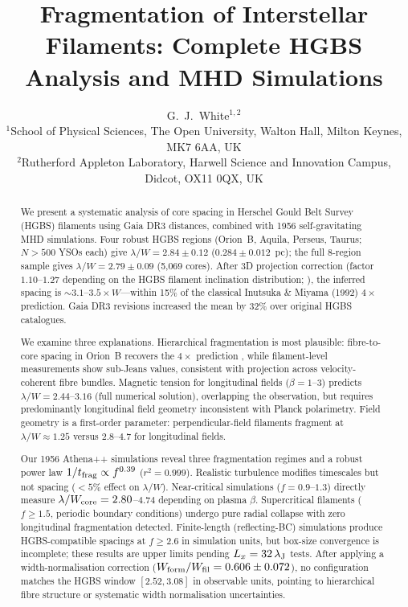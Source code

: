 \documentclass[twoside,twocolumn]{mnras}
\title{Fragmentation of Interstellar Filaments: Complete HGBS Analysis and MHD Simulations}
\author[G.~J.~White]{G.~J.~White$^{1,2}$\\
$^{1}$School of Physical Sciences, The Open University, Walton Hall, Milton Keynes, MK7 6AA, UK\\
$^{2}$Rutherford Appleton Laboratory, Harwell Science and Innovation Campus, Didcot, OX11 0QX, UK}
\begin{document}
\maketitle

\begin{abstract}
We present a systematic analysis of core spacing in Herschel Gould Belt Survey (HGBS)
filaments using Gaia DR3 distances, combined with 1956 self-gravitating MHD simulations.
Four robust HGBS regions (Orion~B, Aquila, Perseus, Taurus; $N>500$ YSOs each) give
$\lambda/W = 2.84 \pm 0.12$ ($0.284 \pm 0.012$~pc); the full 8-region sample gives
$\lambda/W = 2.79 \pm 0.09$ (5,069 cores). After 3D projection correction (factor $1.10$--$1.27$ depending on the HGBS filament inclination distribution; \citealt{Andre2010, Planck2016}),
the inferred spacing is ${\sim}3.1$--$3.5\times W$---within 15\% of the classical
Inutsuka \& Miyama (1992) $4\times$ prediction. Gaia DR3 revisions increased
the mean by 32\% over original HGBS catalogues.

We examine three explanations. Hierarchical fragmentation is most plausible: fibre-to-core
spacing in Orion~B recovers the $4\times$ prediction \citep{Yang2024}, while
filament-level measurements show sub-Jeans values, consistent with projection across
velocity-coherent fibre bundles. Magnetic tension for longitudinal fields ($\beta = 1$--$3$)
predicts $\lambda/W = 2.44$--$3.16$ (full numerical solution), overlapping the observation,
but requires predominantly longitudinal field geometry inconsistent with Planck polarimetry.
Field geometry is a first-order parameter: perpendicular-field filaments fragment at
$\lambda/W \approx 1.25$ versus $2.8$--$4.7$ for longitudinal fields.

Our 1956 Athena++ simulations reveal three fragmentation regimes and a robust power law
$1/t_{\rm frag} \propto f^{0.39}$ ($r^2 = 0.999$). Realistic turbulence modifies
timescales but not spacing ($<5\%$ effect on $\lambda/W$). Near-critical simulations
($f = 0.9$--$1.3$) directly measure $\lambda/W_{\rm core} = 2.80$--$4.74$ depending on
plasma $\beta$. Supercritical filaments ($f \geq 1.5$, periodic boundary conditions)
undergo pure radial collapse with zero longitudinal fragmentation detected.
Finite-length (reflecting-BC) simulations produce HGBS-compatible spacings at $f \geq 2.6$ in simulation units, but box-size convergence is incomplete; these results are upper limits pending $L_x = 32\,\lambda_{\rm J}$ tests.
After applying a width-normalisation correction ($W_{\rm form}/W_{\rm fil} = 0.606 \pm 0.072$),
no configuration matches the HGBS window $[2.52, 3.08]$ in observable units, pointing to
hierarchical fibre structure or systematic width normalisation uncertainties.
\end{abstract}
\end{document}
